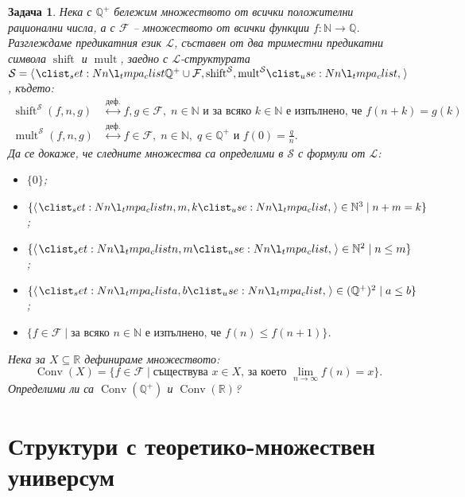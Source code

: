 \documentclass[12pt]{article}
\newcommand{\N}{\mathbb{N}}
\newcommand{\Q}{\mathbb{Q}}
\newcommand{\R}{\mathbb{R}}
\newcommand{\calS}{\mathcal{S}}
\newcommand{\calL}{\mathcal{L}}
\newcommand{\calF}{\mathcal{F}}
\newcommand{\dequiv}{\stackrel{\text{деф.}}{\longleftrightarrow}}
\newtheorem{problem}{Задача}[section]
\theoremstyle{definition}
\begin{document}
\begin{problem}
Нека с $\Q^+$ бележим множеството от всички положителни рационални числа, а с $\calF$ -- множеството от всички функции $f : \N \rightarrow \Q$.
Разглеждаме предикатния език $\calL$, съставен от два триместни предикатни символа $\operatorname{shift}$ и $\operatorname{mult}$, заедно с $\calL$-структурата $\calS = \opair{\Q^+ \cup \calF, \operatorname{shift}^{\calS}, \operatorname{mult}^{\calS}}$, където:
\begin{align*}
    \operatorname{shift}^\calS(f, n, g) & \dequiv f, g \in \calF, \; n \in \N \text{ и за всяко } k \in \N \text{ е изпълнено, че } f(n + k) = g(k) \\
    \operatorname{mult}^\calS(f, n, g)  & \dequiv f \in \calF, \; n \in \N, \; q \in \Q^+ \text{ и } f(0) = \frac{q}{n}.
\end{align*}
Да се докаже, че следните множества са определими в $\calS$ с формули от $\calL$:
\begin{itemize}
    \item[а)] $\{ 0 \}$;
    \item[б)] $\{ \opair{n, m, k} \in \N^3 \mid n + m = k \}$;
    \item[в)] $\{ \opair{n, m} \in \N^2 \mid n \leq m \}$;
    \item[г)] $\{ \opair{a, b} \in (\Q^+)^2 \mid a \leq b \}$;
    \item[д)] $\{ f \in \calF \mid \text{за всяко } n \in \N \text{ е изпълнено, че } f(n) \leq f(n + 1) \}$.
\end{itemize}
Нека за $X \subseteq \R$ дефинираме множеството:
\[
    \operatorname{Conv}(X) = \{ f \in \calF \mid \text{съществува } x \in X \text{, за което } \lim\limits_{n \to \infty} f(n) = x \}.
\]
Определими ли са $\operatorname{Conv}(\Q^+)$ и $\operatorname{Conv}(\R)$?
\end{problem}

\section{Структури с теоретико-множествен универсум}
\end{document}
